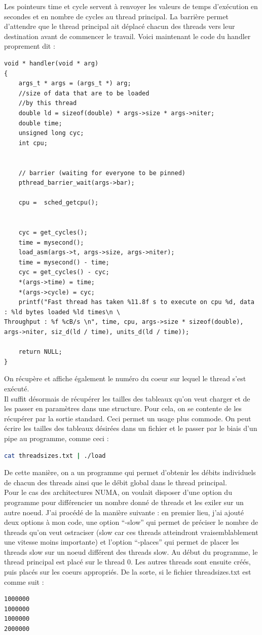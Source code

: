 \documentclass{report}
\begin{document}
Les pointeurs time et cycle servent à renvoyer les valeurs de temps d'exécution en secondes et en 
nombre de cycles au thread principal. La barrière permet d'attendre que le thread principal ait déplacé
chacun des threads vers leur destination avant de commencer le travail. Voici maintenant le code du 
handler proprement dit : 
\begin{lstlisting}
void * handler(void * arg)
{
	args_t * args = (args_t *) arg;
	//size of data that are to be loaded 
	//by this thread
	double ld = sizeof(double) * args->size * args->niter;
	double time;
	unsigned long cyc; 
	int cpu;


	// barrier (waiting for everyone to be pinned)
	pthread_barrier_wait(args->bar);

	cpu =  sched_getcpu();


	cyc = get_cycles();
	time = mysecond();
	load_asm(args->t, args->size, args->niter);
	time = mysecond() - time;
	cyc = get_cycles() - cyc;
	*(args->time) = time;
	*(args->cycle) = cyc;
	printf("Fast thread has taken %11.8f s to execute on cpu %d, data : %ld bytes loaded %ld times\n \
Throughput : %f %cB/s \n", time, cpu, args->size * sizeof(double),  args->niter, siz_d(ld / time), units_d(ld / time));

	return NULL;
}
\end{lstlisting}
On récupère et affiche également le numéro du coeur sur lequel le thread s'est exécuté.
\\Il suffit désormais de récupérer les tailles des tableaux qu'on veut charger et de les passer en 
paramètres dans une structure. Pour cela, on se contente de les récupérer par la sortie standard. 
Ceci permet un usage plus commode. On peut écrire les tailles des tableaux désirées dans un fichier 
et le passer par le biais d'un pipe au programme, comme ceci : 

\begin{lstlisting}[language=bash]
cat threadsizes.txt | ./load 
\end{lstlisting}

De cette manière, on a un programme qui permet d'obtenir les débits individuels de chacun des threads 
ainsi que le débit global dans le thread principal.
\\Pour le cas des architectures NUMA, on voulait disposer d'une option du programme pour différencier
un nombre donné de threads et les exiler sur un autre noeud. J'ai procédé de la manière suivante :
en premier lieu, j'ai ajouté deux options à mon code, une option ``-slow'' qui permet de préciser le
nombre de threads qu'on veut ostraciser (slow car ces threads atteindront vraisemblablement une vitesse
moins importante) et l'option ``-places'' qui permet de placer les threads slow sur un noeud différent
des threads slow. Au début du programme, le thread principal est placé sur le thread 0. Les autres 
threads sont ensuite créés, puis placés sur les coeurs appropriés. De la sorte, si le fichier 
threadsizes.txt est comme suit : 
\begin{lstlisting}[language=bash]
1000000
1000000
1000000
2000000
\end{lstlisting}
\end{document}
